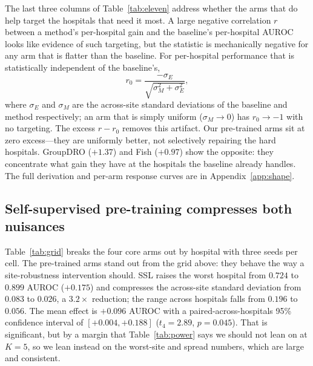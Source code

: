 \documentclass[10pt]{article} %
\begin{document}
The last three columns of Table~\ref{tab:eleven} address whether the arms that
do help target the hospitals that need it most. A large negative correlation
$r$ between a method's per-hospital gain and the baseline's per-hospital AUROC
looks like evidence of such targeting, but the statistic is mechanically
negative for any arm that is flatter than the baseline. For per-hospital
performance that is statistically independent of the baseline's,
\begin{equation}
r_0 = \frac{-\sigma_E}{\sqrt{\sigma_M^2 + \sigma_E^2}},
\label{eq:null}
\end{equation}
where $\sigma_E$ and $\sigma_M$ are the across-site standard deviations of the
baseline and method respectively; an arm that is simply uniform
($\sigma_M \to 0$) has $r_0 \to -1$ with no targeting. The excess $r - r_0$
removes this artifact. Our pre-trained arms sit at zero excess---they are
uniformly better, not selectively repairing the hard hospitals. GroupDRO
($+1.37$) and Fish ($+0.97$) show the opposite: they concentrate what gain
they have at the hospitals the baseline already handles. The full derivation
and per-arm response curves are in Appendix~\ref{app:shape}.

\subsection{Self-supervised pre-training compresses both nuisances}
\label{sec:ssl}

Table~\ref{tab:grid} breaks the four core arms out by hospital with three seeds
per cell. The pre-trained arms stand out from the grid above: they behave the
way a site-robustness intervention should. SSL raises the worst hospital from
$0.724$ to $0.899$ AUROC ($+0.175$) and compresses the across-site standard
deviation from $0.083$ to $0.026$, a $3.2\times$ reduction; the range across
hospitals falls from $0.196$ to $0.056$. The mean effect is $+0.096$ AUROC with
a paired-across-hospitals 95\% confidence interval of $[+0.004, +0.188]$
($t_4=2.89$, $p=0.045$). That is significant, but by a margin that
Table~\ref{tab:power} says we should not lean on at $K=5$, so we lean instead
on the worst-site and spread numbers, which are large and consistent.
\end{document}
